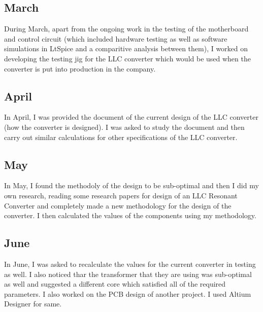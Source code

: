 \subsection{March}
During March, apart from the ongoing work in the testing of the motherboard and
control circuit (which included hardware testing as well as software simulations in LtSpice
and a comparitive analysis between them), I worked on developing the testing jig
for the LLC converter which would be used when the converter is put into production
in the company.

\subsection{April}
In April, I was provided the document of the current design of the LLC converter (how the
converter is designed). I was asked to study the document and then carry out similar calculations
for other specifications of the LLC converter.

\subsection{May}
In May, I found the methodoly of the design to be sub-optimal and then I did my own research,
reading some research papers for design of an LLC Resonant Converter and completely made
a new methodology for the design of the converter. I then calculated the values of the components
using my methodology.

\subsection{June}
In June, I was asked to recalculate the values for the current converter in testing as well.
I also noticed thar the transformer that they are using was sub-optimal as well and suggested
a different core which satisfied all of the required parameters.
I also worked on the PCB design of another project. I used Altium Designer for same.
